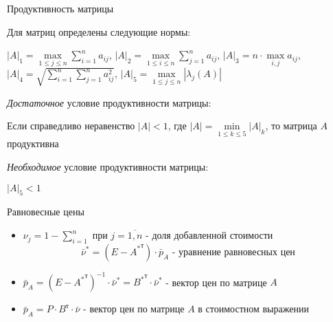 \documentclass[serif,10pt,utf8, russian]{beamer}
\begin{document}
\begin{frame}{Продуктивность матрицы}
\begin{block}{Для матриц определены следующие нормы:}
\pause
\begin{center}
\par{${\left| A\right|}_1 = \max\limits_{1\le j\le n}{\sum\limits_{i=1}^n {a}_{ij}}$, ${\left| A\right|}_2 = \max\limits_{1\le i\le n}{\sum\limits_{j=1}^n {a}_{ij}}$, ${\left| A\right|}_3 = n\cdot\max\limits_{i,j}{{a}_{ij}}$, ${\left| A\right|}_4 = \sqrt{\sum\limits_{i=1}^n{\sum\limits_{j=1}^n {a}_{ij}^2}}$, ${\left| A\right|}_5 = \max\limits_{1\le j\le n}{\left|{\lambda}_j\left(A \right) \right|}$}
\end{center}
\pause
\end{block}
\begin{block}{\textit{Достаточное} условие продуктивности матрицы:}
\pause
\begin{center}
\par{Если справедливо неравенство $\left|A \right|<1$, где $\left|A \right|=\min\limits_{1\le k \le 5}{{\left| A\right|}_k}$, то матрица $A$ продуктивна}
\end{center}
\pause
\end{block}
\begin{block}{\textit{Необходимое} условие продуктивности матрицы:}
\pause
\begin{center}
\par{${\left| A\right|}_5<1$}
\end{center}
\end{block}
\end{frame}

\begin{frame}{Равновесные цены}
\begin{itemize}
\item ${\nu}_j=1-\sum\limits_{i=1}^n$ при $j=\overline{1,n}$ - доля добавленной стоимости
\pause
\begin{equation}
\bar{\nu}^*=\left( E-{{A}^*}^\text{т}\right)\cdot\bar {p}_A\text{ - уравнение равновесных цен}\label{ten}
\end{equation}
\pause
\item $\bar {p}_A={\left(E-{{A}^*}^\text{т} \right)}^{-1}\cdot\bar{\nu}^*={{B}^*}^\text{т}\cdot\bar{\nu}^*$ - вектор цен по матрице $A$
\pause
\item $\bar{p}_A=P\cdot{B}^\text{т}\cdot\bar\nu$ - вектор цен по матрице $A$ в стоимостном выражении
\end{itemize}
\end{frame}
\end{document}
